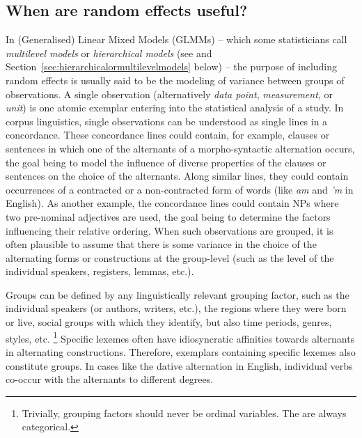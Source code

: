 \subsection{When are random effects useful?}
\label{sec:whenrandomeffectsareuseful}



In (Generalised) Linear Mixed Models (GLMMs) -- which some statisticians call \textit{multilevel models} or \textit{hierarchical models} (see \citealp{GelmanHill2006} and Section~\ref{sec:hierarchicalormultilevelmodels} below) -- the purpose of including random effects is usually said to be the modeling of variance between groups of observations.
A single observation (alternatively \textit{data point}, \textit{measurement}, or \textit{unit}) is one atomic exemplar entering into the statistical analysis of a study.
In corpus linguistics, single observations can be understood as single lines in a concordance.
These concordance lines could contain, for example, clauses or sentences in which one of the alternants of a morpho-syntactic alternation occurs, the goal being to model the influence of diverse properties of the clauses or sentences on the choice of the alternants.
Along similar lines, they could contain occurrences of a contracted or a non-contracted form of words (like \textit{am} and \textit{'m} in English).
As another example, the concordance lines could contain NPs where two pre-nominal adjectives are used, the goal being to determine the factors influencing their relative ordering.
When such observations are grouped, it is often plausible to assume that there is some variance in the choice of the alternating forms or constructions at the group-level (such as the level of the individual speakers, registers, lemmas, etc.).

Groups can be defined by any linguistically relevant grouping factor, such as the individual speakers (or authors, writers, etc.), the regions where they were born or live, social groups with which they identify, but also time periods, genres, styles, etc.%
\footnote{Trivially, grouping factors should never be ordinal variables.
The are always categorical.}
Specific lexemes often have idiosyncratic affinities towards alternants in alternating constructions.
Therefore, exemplars containing specific lexemes also constitute groups.
In cases like the dative alternation in English, individual verbs co-occur with the alternants to different degrees.

